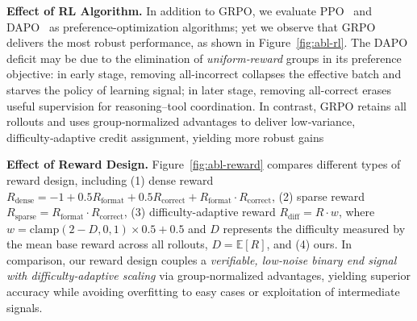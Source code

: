 \noindent \textbf{Effect of RL Algorithm.}
In addition to GRPO, we evaluate PPO~\cite{schulman2017proximal} and DAPO~\cite{yu2025dapo} as preference-optimization algorithms; yet we observe that GRPO delivers the most robust performance, as shown in Figure~\ref{fig:abl-rl}.
The DAPO deficit may be due to the elimination of \emph{uniform‐reward} groups in its preference objective: in early stage, removing all-incorrect collapses the effective batch and starves the policy of learning signal; in later stage, removing all-correct erases useful supervision for reasoning–tool coordination. 
In contrast, GRPO retains all rollouts and uses group‑normalized advantages to deliver low‑variance, difficulty‑adaptive credit assignment, yielding more robust gains

\noindent \textbf{Effect of Reward Design.}
Figure~\ref{fig:abl-reward} compares different types of reward design, including (1) dense reward $R_{\text{dense}}=-1+0.5R_{\text{format}}+0.5R_{\text{correct}}+R_{\text{format}}\cdot R_{\text{correct}}$, (2) sparse reward $R_{\text{sparse}}=R_{\text{format}}\cdot R_{\text{correct}}$, (3) difficulty-adaptive reward $R_{\text{diff}}=R\cdot w$, where $w=\text{clamp}(2-D,0,1)\times0.5+0.5$ and $D$ represents the difficulty measured by the mean base reward across all rollouts, $D=\mathbb{E}[R]$, and (4) ours.
In comparison, our reward design couples a \emph{verifiable, low‑noise binary end signal with difficulty‑adaptive scaling} via group‑normalized advantages, yielding superior accuracy while avoiding overfitting to easy cases or exploitation of intermediate signals. 

